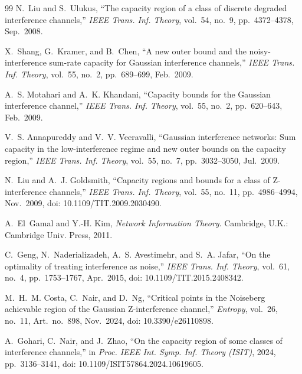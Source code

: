 \documentclass[12pt,draftclsnofoot,onecolumn,conference]{IEEEtran}
\begin{document}
\begin{thebibliography}{99}
N.~Liu and S.~Ulukus, ``The capacity region of a class of discrete degraded
interference channels,'' \emph{IEEE Trans. Inf. Theory}, vol.~54, no.~9,
pp.~4372--4378, Sep.~2008.

X.~Shang, G.~Kramer, and B.~Chen, ``A new outer bound and the
noisy-interference sum-rate capacity for Gaussian interference channels,''
\emph{IEEE Trans. Inf. Theory}, vol.~55, no.~2, pp.~689--699, Feb.~2009.

A.~S. Motahari and A.~K. Khandani, ``Capacity bounds for the Gaussian
interference channel,'' \emph{IEEE Trans. Inf. Theory}, vol.~55, no.~2,
pp.~620--643, Feb.~2009.

V.~S. Annapureddy and V.~V. Veeravalli, ``Gaussian interference networks:
Sum capacity in the low-interference regime and new outer bounds on the
capacity region,'' \emph{IEEE Trans. Inf. Theory}, vol.~55, no.~7,
pp.~3032--3050, Jul.~2009.

N.~Liu and A.~J. Goldsmith, ``Capacity regions and bounds for a class of
Z-interference channels,'' \emph{IEEE Trans. Inf. Theory}, vol.~55, no.~11,
pp.~4986--4994, Nov.~2009, doi: 10.1109/TIT.2009.2030490.

A.~El~Gamal and Y.-H. Kim, \emph{Network Information Theory}. Cambridge,
U.K.: Cambridge Univ. Press, 2011.

C.~Geng, N.~Naderializadeh, A.~S. Avestimehr, and S.~A. Jafar, ``On the
optimality of treating interference as noise,'' \emph{IEEE Trans. Inf.
Theory}, vol.~61, no.~4, pp.~1753--1767, Apr.~2015,
doi: 10.1109/TIT.2015.2408342.

M.~H.~M. Costa, C.~Nair, and D.~Ng, ``Critical points in the Noiseberg
achievable region of the Gaussian Z-interference channel,'' \emph{Entropy},
vol.~26, no.~11, Art.~no.~898, Nov.~2024,
doi: 10.3390/e26110898.

A.~Gohari, C.~Nair, and J.~Zhao, ``On the capacity region of some classes of
interference channels,'' in \emph{Proc. IEEE Int. Symp. Inf. Theory
(ISIT)}, 2024, pp.~3136--3141,
doi: 10.1109/ISIT57864.2024.10619605.

\end{thebibliography}
\end{document}
